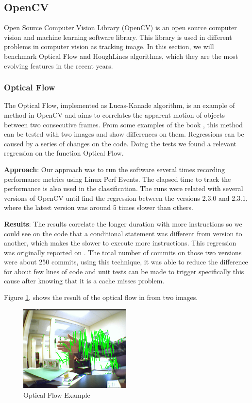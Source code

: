     
\subsection{OpenCV}
Open Source Computer Vision Library (OpenCV) is an open source computer vision and machine learning software library. This library is used in different problems in computer vision as tracking image. In this section, we will benchmark Optical Flow and HoughLines algorithms, which they are the most evolving features in the recent years.

\subsubsection{Optical Flow} 
The Optical Flow, implemented as Lucas-Kanade algorithm, is an example of method in OpenCV and aims to correlates the apparent motion of objects between two consecutive frames. From some examples of the book \cite{opencv2_book}, this method can be tested with two images and show differences on them. Regressions can be caused by a series of changes on the code. Doing the tests we found a relevant regression on the function Optical Flow.

\textbf{Approach}: Our approach was to run the software several times recording performance metrics using Linux Perf Events. The elapsed time to track the performance is also used in the classification. The runs were related with several versions of OpenCV until find the regression between the versions 2.3.0 and 2.3.1, where the latest version was around 5 times slower than others.

\textbf{Results}: The results correlate the longer duration with more instructions so we could see on the code that a conditional statement was different from version to another, which makes the slower to execute more instructions. This regression was originally reported on \cite{regression_opencv}.
The total number of commits on those two versions were about 250 commits, using this technique, it was able to reduce the difference for about few lines of code and unit tests can be made to trigger specifically this cause after knowing that it is a cache misses problem.

Figure \ref{fig:OpenCV}, shows the result of the optical flow in from two images.
    
\begin{figure}[h]
      \centering
        \includegraphics[width=0.50\textwidth]{figures/flow.png}
        \caption{Optical Flow Example}
        \label{fig:OpenCV}
\end{figure}

